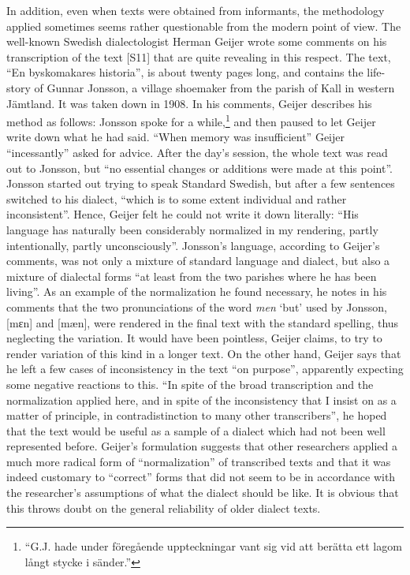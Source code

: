 
In addition, even when texts were obtained from informants, the methodology applied sometimes seems rather questionable from the modern point of view. The well-known Swedish dialectologist Herman Geijer wrote some comments on his transcription of the text [S11] that are quite revealing in this respect. The text, “En byskomakares historia”, is about twenty pages long, and contains the life-story of Gunnar Jonsson, a village shoemaker from the parish of Kall in western Jämtland. It was taken down in 1908. In his comments, Geijer describes his method as follows: Jonsson spoke for a while,\footnote{ “G.J. hade under föregående uppteckningar vant sig vid att berätta ett lagom långt stycke i sänder.”} and then paused to let Geijer write down what he had said. “When memory was insufficient” Geijer “incessantly” asked for advice. After the day’s session, the whole text was read out to Jonsson, but “no essential changes or additions were made at this point”. Jonsson started out trying to speak Standard Swedish, but after a few sentences switched to his dialect, “which is to some extent individual and rather inconsistent”. Hence, Geijer felt he could not write it down literally: “His language has naturally been considerably normalized in my rendering, partly intentionally, partly unconsciously”. Jonsson’s language, according to Geijer’s comments, was not only a mixture of standard language and dialect, but also a mixture of dialectal forms “at least from the two parishes where he has been living”. As an example of the normalization he found necessary, he notes in his comments that the two pronunciations of the word \textit{men} ‘but’ used by Jonsson, [mɛn] and [mæn], were rendered in the final text with the standard spelling, thus neglecting the variation. It would have been pointless, Geijer claims, to try to render variation of this kind in a longer text. On the other hand, Geijer says that he left a few cases of inconsistency in the text “on purpose”, apparently expecting some negative reactions to this. “In spite of the broad transcription and the normalization applied here, and in spite of the inconsistency that I insist on as a matter of principle, in contradistinction to many other transcribers”, he hoped that the text would be useful as a sample of a dialect which had not been well represented before. Geijer’s formulation suggests that other researchers applied a much more radical form of “normalization” of transcribed texts and that it was indeed customary to “correct” forms that did not seem to be in accordance with the researcher’s assumptions of what the dialect should be like. It is obvious that this throws doubt on the general reliability of older dialect texts.

